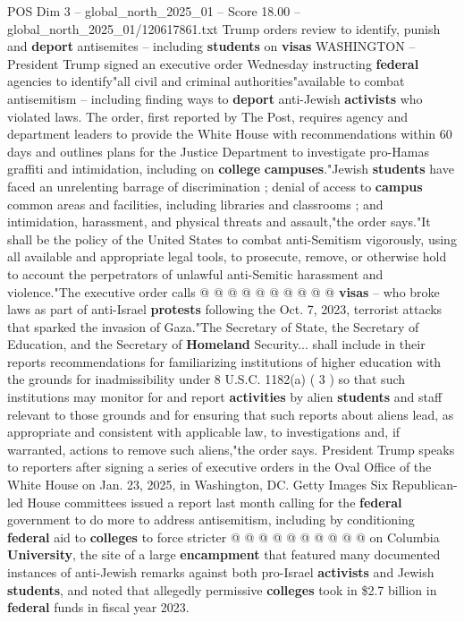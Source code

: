 \begin{textsample}{POS Dim 3 – global\_north\_2025\_01 – Score 18.00 – global\_north\_2025\_01/120617861.txt}  \label{ex:f3_pos_243}
Trump orders review to identify, punish and \textbf{deport} antisemites -- including \textbf{students} on \textbf{visas} WASHINGTON -- President Trump signed an executive order Wednesday instructing \textbf{federal} agencies to identify"all civil and criminal authorities"available to combat antisemitism -- including finding ways to \textbf{deport} anti-Jewish \textbf{activists} who violated laws.
The order, first reported by The Post, requires agency and department leaders to provide the White House with recommendations within 60 days and outlines plans for the Justice Department to investigate pro-Hamas graffiti and intimidation, including on \textbf{college} \textbf{campuses}."Jewish \textbf{students} have faced an unrelenting barrage of discrimination ; denial of access to \textbf{campus} common areas and facilities, including libraries and classrooms ; and intimidation, harassment, and physical threats and assault,"the order says."It shall be the policy of the United States to combat anti-Semitism vigorously, using all available and appropriate legal tools, to prosecute, remove, or otherwise hold to account the perpetrators of unlawful anti-Semitic harassment and violence."The executive order calls @ @ @ @ @ @ @ @ @ @ \textbf{visas} -- who broke laws as part of anti-Israel \textbf{protests} following the Oct. 7, 2023, terrorist attacks that sparked the invasion of Gaza."The Secretary of State, the Secretary of Education, and the Secretary of \textbf{Homeland} Security... shall include in their reports recommendations for familiarizing institutions of higher education with the grounds for inadmissibility under 8 U.S.C. 1182(a) ( 3 ) so that such institutions may monitor for and report \textbf{activities} by alien \textbf{students} and staff relevant to those grounds and for ensuring that such reports about aliens lead, as appropriate and consistent with applicable law, to investigations and, if warranted, actions to remove such aliens,"the order says.
President Trump speaks to reporters after signing a series of executive orders in the Oval Office of the White House on Jan. 23, 2025, in Washington, DC.
Getty Images Six Republican-led House committees issued a report last month calling for the \textbf{federal} government to do more to address antisemitism, including by conditioning \textbf{federal} aid to \textbf{colleges} to force stricter @ @ @ @ @ @ @ @ @ @ on Columbia \textbf{University}, the site of a large \textbf{encampment} that featured many documented instances of anti-Jewish remarks against both pro-Israel \textbf{activists} and Jewish \textbf{students}, and noted that allegedly permissive \textbf{colleges} took in \$2.7 billion in \textbf{federal} funds in fiscal year 2023.

\end{textsample}
